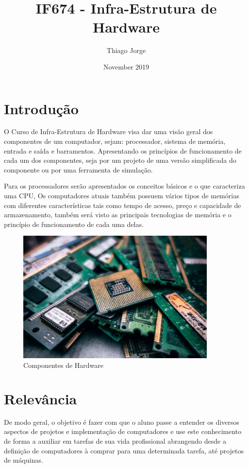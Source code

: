 \documentclass[10pt]{article}
\title{IF674 - Infra-Estrutura de Hardware}
\author{Thiago Jorge}
\date{November 2019}
\begin{document}
\maketitle

\section{Introdução}
O Curso de Infra-Estrutura de Hardware visa dar uma visão geral dos componentes de um computador, sejam: processador, sistema de memória, entrada e saída e barramentos. Apresentando os princípios de funcionamento de cada um dos componentes, seja por um projeto de uma versão simplificada do componente ou por uma ferramenta de simulação.

Para os processadores serão apresentados os conceitos básicos e o que caracteriza uma CPU, Os computadores atuais também possuem vários tipos de memórias com diferentes características tais como tempo de acesso, preço e capacidade de armazenamento, também será visto as principais tecnologias de memória e o princípio de funcionamento de cada uma delas.

\begin{figure}[h!]
    \centering
    \includegraphics[width=10cm]{componentes.jpg} 
    \caption{Componentes de Hardware}
    \label{fig:my_label}
\end{figure}

\section{Relevância}
De modo geral, o objetivo é fazer com que o aluno passe a entender os diversos aspectos de projetos e implementação de computadores e use este conhecimento de forma a auxiliar em tarefas de sua vida profissional abrangendo desde a definição de computadores à comprar para uma determinada tarefa, até projetos de máquinas.
\end{document}
